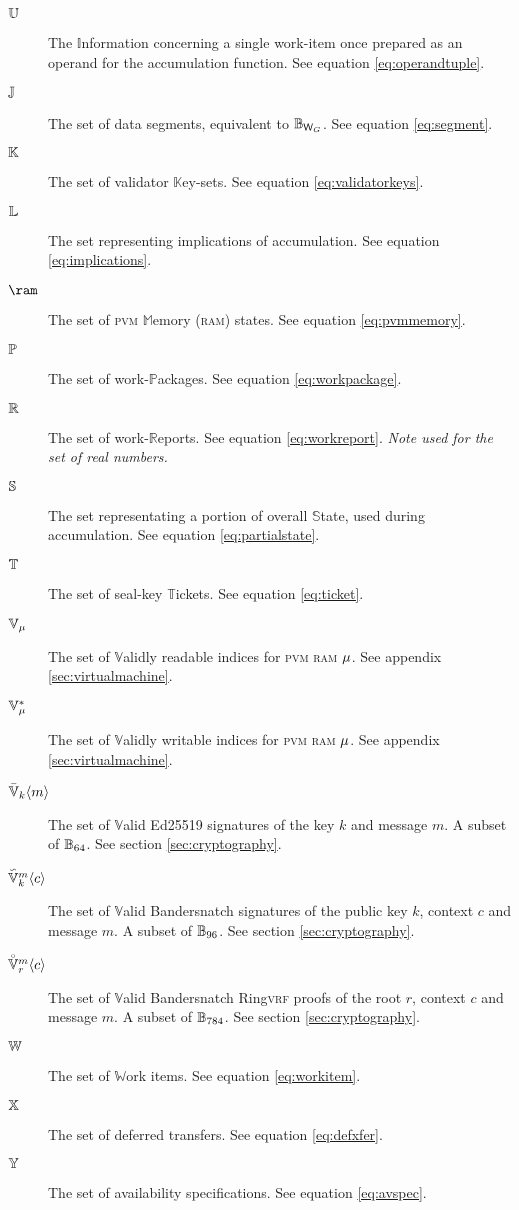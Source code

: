 \begin{description}
\begin{description}
  \end{description}
  \item[$\operandtuple$] The $\mathbb{I}$nformation concerning a single work-item once prepared as an operand for the accumulation function. See equation \ref{eq:operandtuple}.
  \item[$\segment$] The set of data segments, equivalent to $\blob[\Csegmentsize]$. See equation \ref{eq:segment}.
  \item[$\valkey$] The set of validator $\mathbb{K}$ey-sets. See equation \ref{eq:validatorkeys}.
  \item[$\implications$] The set representing implications of accumulation. See equation \ref{eq:implications}.
  \item[$\ram$] The set of \textsc{pvm} $\mathbb{M}$emory (\textsc{ram}) states. See equation \ref{eq:pvmmemory}.
  \item[$\workpackage$] The set of work-$\mathbb{P}$ackages. See equation \ref{eq:workpackage}.
  \item[$\workreport$] The set of work-$\mathbb{R}$eports. See equation \ref{eq:workreport}. \emph{Note used for the set of real numbers.}
  \item[$\partialstate$] The set representating a portion of overall $\mathbb{S}$tate, used during accumulation. See equation \ref{eq:partialstate}.
  \item[$\safroleticket$] The set of seal-key $\mathbb{T}$ickets. See equation \ref{eq:ticket}.
  \item[$\readable{\memory}$] The set of $\mathbb{V}$alidly readable indices for \textsc{pvm} \textsc{ram} $\memory$. See appendix \ref{sec:virtualmachine}.
  \item[$\writable{\memory}$] The set of $\mathbb{V}$alidly writable indices for \textsc{pvm} \textsc{ram} $\memory$. See appendix \ref{sec:virtualmachine}.
  \item[$\edsignature{k}{m}$] The set of $\mathbb{V}$alid Ed25519 signatures of the key $k$ and message $m$. A subset of $\blob[64]$. See section \ref{sec:cryptography}.
  \item[$\bssignature{k}{c}{m}$] The set of $\mathbb{V}$alid Bandersnatch signatures of the public key $k$, context $c$ and message $m$. A subset of $\blob[96]$. See section \ref{sec:cryptography}.
  \item[$\bsringproof{r}{c}{m}$] The set of $\mathbb{V}$alid Bandersnatch Ring\textsc{vrf} proofs of the root $r$, context $c$ and message $m$. A subset of $\blob[784]$. See section \ref{sec:cryptography}.
  \item[$\workitem$] The set of $\mathbb{W}$ork items. See equation \ref{eq:workitem}.
  \item[$\defxfer$] The set of deferred transfers. See equation \ref{eq:defxfer}.
  \item[$\avspec$] The set of availability specifications. See equation \ref{eq:avspec}.
\end{description}

